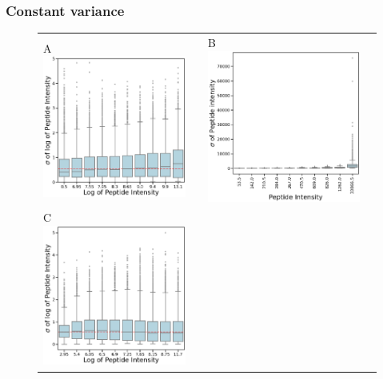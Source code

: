 \documentclass[11pt]{article}
\begin{document}
\subsubsection*{Constant variance}
\begin{figure}[hbt]
    \centering
    \centering
    \begin{tabular}{lclc} 
        A \includegraphics[width=0.5\linewidth]{../../result/mu_sigma_variance_plots/osw_log/osw_boxplot_qvalFiltered_pepFiltered_qbinned.png} & &%
        B \includegraphics[width=0.5\linewidth]{../../result/mu_sigma_variance_plots/osw/osw_boxplot_nolog_qvalFiltered_pepFiltered_qbinned.png} & \\%
        C \includegraphics[width=0.5\linewidth]{../../result/mu_sigma_variance_plots/diann_log/diann_boxplot_qvalFiltered_pepFiltered_qbinned.png} & &%

\end{tabular}
\end{figure}
\end{document}
